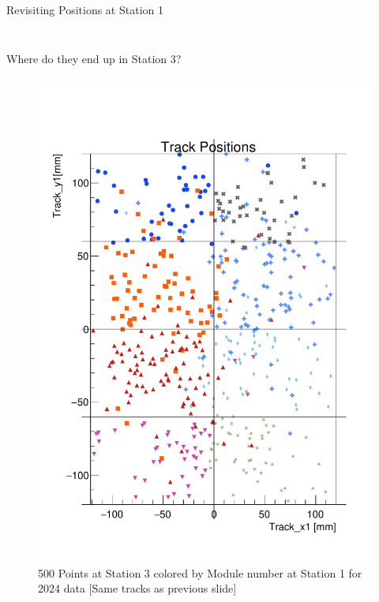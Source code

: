 \begin{frame}{Revisiting Positions at Station 1}
\begin{columns}
\begin{column}{0.2\linewidth}
\begin{figure}
            \end{figure}
        \end{column}
    \end{columns}
\end{frame}

\begin{frame}{Where do they end up in Station 3?}
    \begin{columns}
        \begin{column}{1.2\linewidth}
            \begin{figure}
                \centering
                \includegraphics[height=0.8\textheight]{./ModuleLevelPlots/Positions_st1_module0.pdf}
                \caption{500 Points at Station 3 colored by Module number at Station 1 for 2024 data [Same tracks as previous slide]}
            \end{figure}
        \end{column}

\end{columns}
\end{frame}
